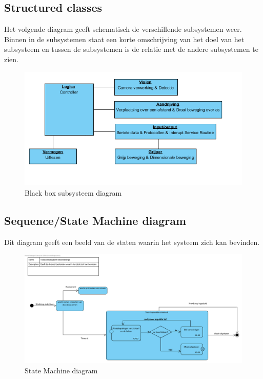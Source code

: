 \documentclass[12pt]{article} %
\begin{document}
\subsection{Structured classes}
Het volgende diagram geeft schematisch de verschillende subsystemen weer. Binnen in de subsystemen staat een korte omschrijving van het doel van het subsysteem en tussen de subsystemen is de relatie met de andere subsystemen te zien.
\begin{center}
\begin{figure}[h]
\includegraphics[scale=1.]{BlackBoxDiagram.png}
\caption{Black box subsysteem diagram}
\label{fig:deployment}
\end{figure}
\end{center}
\clearpage
\begin{landscape}
\subsection{Sequence/State Machine diagram}
Dit diagram geeft een beeld van de staten waarin het systeem zich kan bevinden. 
\begin{center}
\begin{figure}[h]
\includegraphics[scale=.6]{StateMachineDiagram.png}
\caption{State Machine diagram}
\label{fig:deployment}
\end{figure}
\end{center}
\clearpage
\newpage
\end{landscape}
\end{document}
